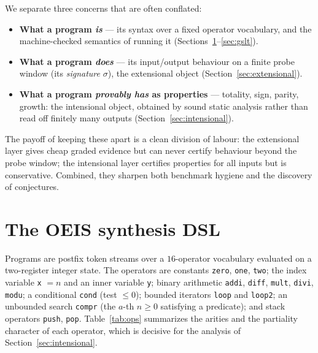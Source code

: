 \documentclass[11pt]{article}
\newcommand{\code}[1]{\texttt{#1}}
\newcommand{\sig}{\ensuremath{\sigma}}
\begin{document}
We separate three concerns that are often conflated:
\begin{itemize}
  \item \textbf{What a program \emph{is}} --- its syntax over a fixed operator vocabulary,
        and the machine-checked semantics of running it (Sections~\ref{sec:dsl}--\ref{sec:gslt}).
  \item \textbf{What a program \emph{does}} --- its input/output behaviour on a finite probe
        window (its \emph{signature} \sig), the extensional object
        (Section~\ref{sec:extensional}).
  \item \textbf{What a program \emph{provably has} as properties} --- totality, sign,
        parity, growth: the intensional object, obtained by sound static analysis rather
        than read off finitely many outputs (Section~\ref{sec:intensional}).
\end{itemize}
The payoff of keeping these apart is a clean division of labour: the extensional layer
gives cheap graded evidence but can never certify behaviour beyond the probe window; the
intensional layer certifies properties for all inputs but is conservative. Combined, they
sharpen both benchmark hygiene and the discovery of conjectures.

\section{The OEIS synthesis DSL}
\label{sec:dsl}

Programs are postfix token streams over a $16$-operator vocabulary evaluated on a
two-register integer state. The operators are constants \code{zero}, \code{one},
\code{two}; the index variable \code{x} $=n$ and an inner variable \code{y}; binary
arithmetic \code{addi}, \code{diff}, \code{mult}, \code{divi}, \code{modu}; a conditional
\code{cond} (test $\le 0$); bounded iterators \code{loop} and \code{loop2}; an unbounded
search \code{compr} (the $a$-th $n\ge 0$ satisfying a predicate); and stack operators
\code{push}, \code{pop}. Table~\ref{tab:ops} summarizes the arities and the partiality
character of each operator, which is decisive for the analysis of
Section~\ref{sec:intensional}.
\end{document}
